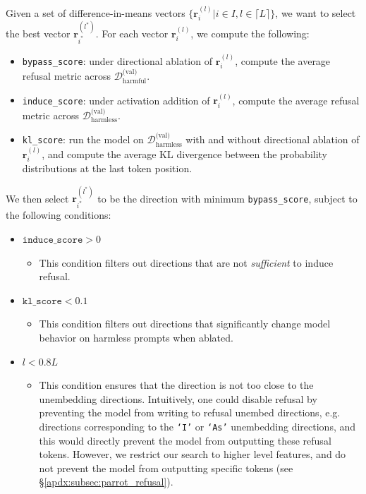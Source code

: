 \documentclass{article}
\begin{document}
Given a set of difference-in-means vectors $\{ \mathbf{r}_i^{(l)}| i \in I, l \in \lceil L \rceil \}$, we want to select the best vector $\mathbf{r}_{i^*}^{(l^*)}$. For each vector $\mathbf{r}_i^{(l)}$, we compute the following:
\begin{itemize}
    \item \texttt{bypass\_score}: under directional ablation of $\mathbf{r}_i^{(l)}$, compute the average refusal metric across $\mathcal{D}_{\text{harmful}}^{\text{(val)}}$.
    \item \texttt{induce\_score}: under activation addition of $\mathbf{r}_i^{(l)}$, compute the average refusal metric across $\mathcal{D}_{\text{harmless}}^{\text{(val)}}$.
    \item \texttt{kl\_score}: run the model on $\mathcal{D}_{\text{harmless}}^{\text{(val)}}$ with and without directional ablation of $\mathbf{r}_i^{(l)}$, and compute the average KL divergence between the probability distributions at the last token position.
\end{itemize}

We then select $\mathbf{r}_{i^*}^{(l^*)}$ to be the direction with minimum \texttt{bypass\_score}, subject to the following conditions:
\begin{itemize}
    \item $\texttt{induce\_score} > 0$
    \begin{itemize}
        \item This condition filters out directions that are not \emph{sufficient} to induce refusal.
    \end{itemize}
    \item $\texttt{kl\_score} < 0.1$
    \begin{itemize}
        \item This condition filters out directions that significantly change model behavior on harmless prompts when ablated.
    \end{itemize}
    \item $l < 0.8L$
    \begin{itemize}
        \item This condition ensures that the direction is not too close to the unembedding directions. Intuitively, one could disable refusal by preventing the model from writing to refusal unembed directions, e.g. directions corresponding to the \texttt{`I'} or \texttt{`As'} unembedding directions, and this would directly prevent the model from outputting these refusal tokens. However, we restrict our search to higher level features, and do not prevent the model from outputting specific tokens (see \S\ref{apdx:subsec:parrot_refusal}). 
    \end{itemize}
\end{itemize}
\end{document}
